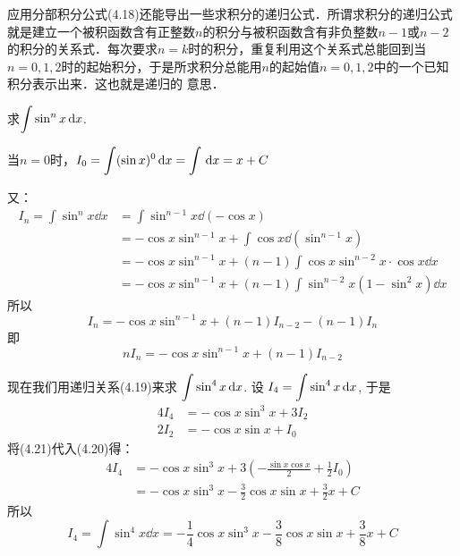 应用分部积分公式(4.18)还能导出一些求积分的递归公式．所谓求积分的递归公式就是建立一个被积函数含有正整数$n$的积分与被积函数含有非负整数$n-1$或$n-2$的积分的关系式．每次要求$n=k$时的积分，重复利用这个关系式总能回到当$n=0, 1, 2$时的起始积分，于是所求积分总能用$n$的起始值$n=0, 1, 2$中的一个已知积分表示出来．这也就是递归的
意思．
    
\begin{example}
    求$\displaystyle\int \sin^n x\,{\rm d} x$.
\end{example}

\begin{solution}
当$n=0$时，$I_0=\displaystyle\int (\sin x)^0\,{\rm d} x=\displaystyle\int \,{\rm d} x=x+C$

又：
\[
\begin{split}
I_{n} =\int \sin ^{n} x \dd x&=\int \sin ^{n-1} x \dd(-\cos x) \\
&=-\cos x \sin ^{n-1} x+\int \cos x \dd\left(\sin ^{n-1} x\right) \\
&=-\cos x \sin ^{n-1} x+(n-1) \int \cos x \sin ^{n-2} x \cdot \cos x \dd x \\
&=-\cos x \sin ^{n-1} x+(n-1) \int \sin ^{n-2} x\left(1-\sin ^{2} x\right) \dd x
\end{split}
\]
所以
$$
I_{n}=-\cos x \sin ^{n-1} x+(n-1) I_{n-2}-(n-1) I_{n}
$$
即
\begin{equation}
   n I_{n}=-\cos x \sin ^{n-1} x+(n-1) I_{n-2} 
\end{equation}

现在我们用递归关系(4.19)来求 $\displaystyle\int \sin ^{4} x \,{\rm d} x$. 
设 $I_{4}=\displaystyle\int \sin ^{4} x \,{\rm d} x$, 于是
\begin{align}
4 I_{4}&=-\cos x \sin ^{3} x+3 I_{2} \\
2 I_{2}&=-\cos x \sin x+I_{0} 
\end{align}
将(4.21)代入(4.20)得：
\[\begin{split}
    4I_4&=-\cos x\sin^3 x+3\left(-\frac{\sin x\cos x}{2}+\frac{1}{2}I_0\right)\\
    &=-\cos x\sin^3 x-\frac{3}{2}\cos x\sin x+\frac{3}{2}x+C
\end{split}\]
所以
\[I_4=\int \sin^4 x\dd x=-\frac{1}{4}\cos x\sin^3 x-\frac{3}{8}\cos x\sin x+\frac{3}{8}x+C\]
\end{solution}


